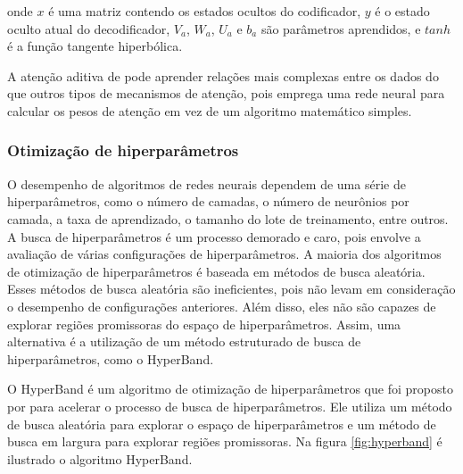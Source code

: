             \noindent onde $x$ é uma matriz contendo os estados ocultos do codificador, $y$ é o estado oculto atual do decodificador, $V_a$, $W_a$, $U_a$ e $b_a$ são parâmetros aprendidos, e $tanh$ é a função tangente hiperbólica.

            \ipar A atenção aditiva de  pode aprender relações mais complexas entre os dados do que outros tipos de mecanismos de atenção, pois emprega uma rede neural para calcular os pesos de atenção em vez de um algoritmo matemático simples.

            \subsubsection{Otimização de hiperparâmetros}

            \ipar O desempenho de algoritmos de redes neurais dependem de uma série de hiperparâmetros, como o número de camadas, o número de neurônios por camada, a taxa de aprendizado, o tamanho do lote de treinamento, entre outros. A busca de hiperparâmetros é um processo demorado e caro, pois envolve a avaliação de várias configurações de hiperparâmetros. A maioria dos algoritmos de otimização de hiperparâmetros é baseada em métodos de busca aleatória. Esses métodos de busca aleatória são ineficientes, pois não levam em consideração o desempenho de configurações anteriores. Além disso, eles não são capazes de explorar regiões promissoras do espaço de hiperparâmetros. Assim, uma alternativa é a utilização de um método estruturado de busca de hiperparâmetros, como o HyperBand.

            \ipar O HyperBand é um algoritmo de otimização de hiperparâmetros que foi proposto por  para acelerar o processo de busca de hiperparâmetros. Ele utiliza um método de busca aleatória para explorar o espaço de hiperparâmetros e um método de busca em largura para explorar regiões promissoras. Na figura \ref{fig:hyperband} é ilustrado o algoritmo HyperBand.

